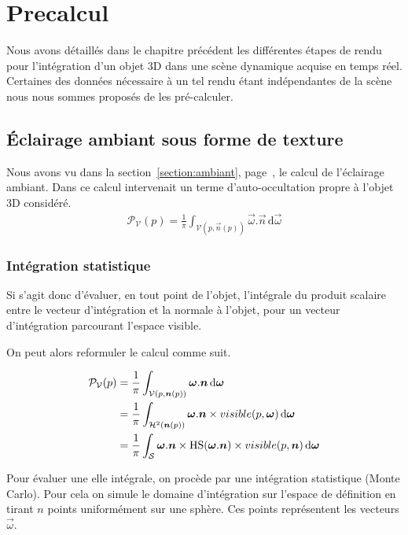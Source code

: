 \documentclass[10pt,a4paper,twoside, twocolumn]{report}
\begin{document}
\chapter{Precalcul}

Nous avons détaillés dans le chapitre précédent les différentes étapes de rendu pour l'intégration d'un objet 3D dans une scène dynamique acquise en temps réel. Certaines des données nécessaire à un tel rendu étant indépendantes de la scène nous nous sommes proposés de les pré-calculer. 

\section{Éclairage ambiant sous forme de texture}\label{section:precomputation_ambiant}

Nous avons vu dans la section~\ref{section:ambiant}, page~\pageref{section:ambiant}, le calcul de l'éclairage ambiant. Dans ce calcul intervenait un terme d'auto-occultation propre à l'objet 3D considéré.
\begin{align}
	\mathcal P_{\mathcal V}(p) = \frac{1}{\pi}\int_{\mathcal V(p, \vec n(p))}\vec\omega.\vec n\, \mathrm d\vec\omega
\end{align}

\subsection{Intégration statistique}
Si s’agit donc d'évaluer, en tout point de l'objet, l’intégrale du produit scalaire entre le vecteur d’intégration et la normale à l'objet, pour un vecteur d’intégration parcourant l’espace visible.

On peut alors reformuler le calcul comme suit.

\begin{align}
\mathcal P_{\mathcal V}(p)	&= \frac{1}{\pi}\int_{\mathcal V(p, \vec n(p))}\vec\omega.\vec n\, \mathrm d\vec\omega \notag\\
														&= \frac{1}{\pi}\int_{\mathcal H^2(\vec n(p))}\vec\omega.\vec n\times visible(p, \vec \omega)\, \mathrm d\vec\omega \notag\\
														&= \frac{1}{\pi}\int_{\mathcal S}\vec\omega.\vec n\times \Hs(\vec \omega.\vec n)\times visible(p, \vec n)\, \mathrm d\vec\omega
\end{align}

Pour évaluer une elle intégrale, on procède par une intégration statistique (Monte Carlo). Pour cela on simule le domaine d'intégration sur l'espace de définition en tirant $n$ points uniformément sur une sphère. Ces points représentent les vecteurs $\vec\omega$.
\end{document}
